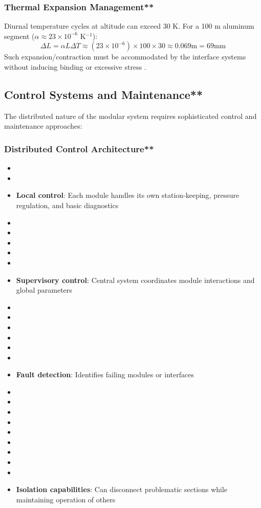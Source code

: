 \subsubsection{Thermal Expansion Management**}
Diurnal temperature cycles at altitude can exceed 30 K. For a 100 m aluminum segment ($\alpha \approx 23 \times 10^{-6}$ K$^{-1}$):
\begin{equation}
\Delta L = \alpha L \Delta T \approx (23 \times 10^{-6}) \times 100 \times 30 \approx 0.069  \text{m} = 69  \text{mm}
\end{equation}
Such expansion/contraction must be accommodated by the interface systems without inducing binding or excessive stress \cite{bickford1995}.

\subsection{Control Systems and Maintenance**}
The distributed nature of the modular system requires sophisticated control and maintenance approaches:

\subsubsection{Distributed Control Architecture**}
\begin{itemize}
    \item \item \item \textbf{Local control}: Each module handles its own station-keeping, pressure regulation, and basic diagnostics \cite{antsaklis2007}
    \item \item \item \item \item \item \textbf{Supervisory control}: Central system coordinates module interactions and global parameters \cite{antsaklis2007}
    \item \item \item \item \item \item \item \textbf{Fault detection}: Identifies failing modules or interfaces \cite{isermann2006}
    \item \item \item \item \item \item \item \item \item \item \textbf{Isolation capabilities}: Can disconnect problematic sections while maintaining operation of others \cite{avizienis2004}
\end{itemize}

